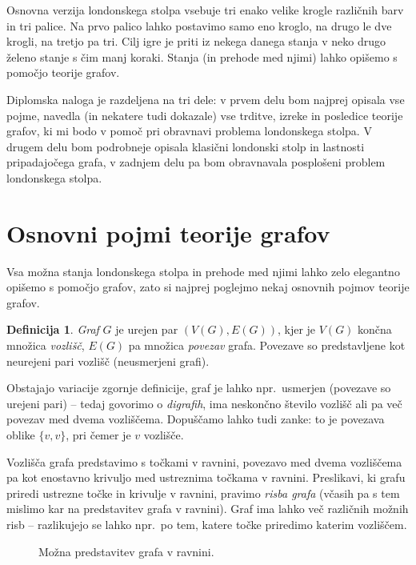 \documentclass[12pt,a4paper]{amsart}
\theoremstyle{definition} %
\newtheorem{definicija}{Definicija}[section]
\theoremstyle{plain} %
\newcommand{\vozlisca}[1][G]{\ensuremath{V(#1)}}
\newcommand{\povezave}[1][G]{\ensuremath{E(#1)}}
\begin{document}
Osnovna verzija londonskega stolpa vsebuje tri enako velike krogle različnih barv in tri palice. Na prvo palico lahko postavimo samo eno kroglo, na drugo le dve krogli, na tretjo pa tri. Cilj igre je priti iz nekega danega stanja v neko drugo želeno stanje s čim manj koraki. Stanja (in prehode med njimi) lahko opišemo s pomočjo teorije grafov.

Diplomska naloga je razdeljena na tri dele: v prvem delu bom najprej opisala vse pojme, navedla (in nekatere tudi dokazale) vse trditve, izreke in posledice teorije grafov, ki mi bodo v pomoč pri obravnavi problema londonskega stolpa. V drugem delu bom podrobneje opisala klasični londonski stolp in lastnosti pripadajočega grafa, v zadnjem delu pa bom obravnavala posplošeni problem londonskega stolpa.


\section{Osnovni pojmi teorije grafov}

Vsa možna stanja londonskega stolpa in prehode med njimi lahko zelo elegantno opišemo s pomočjo grafov, zato si najprej poglejmo nekaj osnovnih pojmov teorije grafov.

\begin{definicija}
	\emph{Graf} $G$ je urejen par $(\vozlisca, \povezave)$, kjer je $\vozlisca$ končna množica \emph{vozlišč}, $\povezave$ pa množica \emph{povezav} grafa. Povezave so predstavljene kot neurejeni pari vozlišč (neusmerjeni grafi).
\end{definicija}

Obstajajo variacije zgornje definicije, graf je lahko npr.\ usmerjen (povezave so urejeni pari) -- tedaj govorimo o \emph{digrafih}, ima neskončno število vozlišč ali pa več povezav med dvema vozliščema. Dopuščamo lahko tudi zanke: to je povezava oblike $\{v,v\}$, pri čemer je $v$ vozlišče.

Vozlišča grafa predstavimo s točkami v ravnini, povezavo med dvema vozliščema pa kot enostavno krivuljo med ustreznima točkama v ravnini. Preslikavi, ki grafu priredi ustrezne točke in krivulje v ravnini, pravimo \emph{risba grafa} (včasih pa s tem mislimo kar na predstavitev grafa v ravnini). Graf ima lahko več različnih možnih risb -- razlikujejo se lahko npr.\ po tem, katere točke priredimo katerim vozliščem.

\begin{figure}[h]
    \caption{Možna predstavitev grafa v ravnini.}
\end{figure}
    
\end{document}

